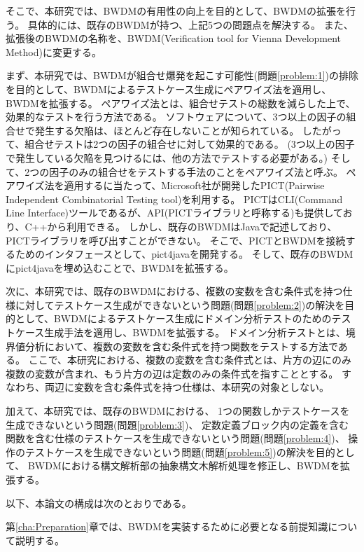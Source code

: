 \documentclass[uplatex, report, a4j, 10pt]{jsbook}
\newcommand{\tool}{BWDM}
\newcommand{\toolFullName}{Verification tool for Vienna Development Method}
\begin{document}
そこで、本研究では、BWDMの有用性の向上を目的として、BWDMの拡張を行う\cite{hirakoba1, hirakoba2, hirakoba3, hirakoba4, hirakoba5}。
具体的には、既存のBWDMが持つ、上記5つの問題点を解決する。
また、拡張後のBWDMの名称を、\tool{}(\toolFullName{})に変更する。

まず、本研究では、BWDMが組合せ爆発を起こす可能性(問題\ref{problem:1})の排除を目的として、BWDMによるテストケース生成にペアワイズ法を適用し、BWDMを拡張する。
ペアワイズ法とは、組合せテストの総数を減らした上で、効果的なテストを行う方法である\cite{pairwise}。
ソフトウェアについて、3つ以上の因子の組合せで発生する欠陥は、ほとんど存在しないことが知られている\cite{over3fact}。
したがって、組合せテストは2つの因子の組合せに対して効果的である。
(3つ以上の因子で発生している欠陥を見つけるには、他の方法でテストする必要がある。)
そして、2つの因子のみの組合せをテストする手法のことをペアワイズ法と呼ぶ。
ペアワイズ法を適用するに当たって、Microsoft社が開発したPICT(Pairwise Independent Combinatorial Testing tool)\cite{pict}を利用する。
PICTはCLI(Command Line Interface)ツールであるが、API(PICTライブラリと呼称する)も提供しており、C++から利用できる。
しかし、既存のBWDMはJavaで記述しており、PICTライブラリを呼び出すことができない。
そこで、PICTとBWDMを接続するためのインタフェースとして、pict4javaを開発する。
そして、既存のBWDMにpict4javaを埋め込むことで、BWDMを拡張する。

次に、本研究では、既存のBWDMにおける、複数の変数を含む条件式を持つ仕様に対してテストケース生成ができないという問題(問題\ref{problem:2})の解決を目的として、BWDMによるテストケース生成にドメイン分析テストのためのテストケース生成手法を適用し、BWDMを拡張する。
ドメイン分析テストとは、境界値分析において、複数の変数を含む条件式を持つ関数をテストする方法である\cite{izon}\cite{istqb}。
ここで、本研究における、複数の変数を含む条件式とは、片方の辺にのみ複数の変数が含まれ、もう片方の辺は定数のみの条件式を指すこととする。
すなわち、両辺に変数を含む条件式を持つ仕様は、本研究の対象としない。

加えて、本研究では、既存のBWDMにおける、
1つの関数しかテストケースを生成できないという問題(問題\ref{problem:3})、
定数定義ブロック内の定義を含む関数を含む仕様のテストケースを生成できないという問題(問題\ref{problem:4})、
操作のテストケースを生成できないという問題(問題\ref{problem:5})の解決を目的として、
BWDMにおける構文解析部の抽象構文木解析処理を修正し、BWDMを拡張する。

以下、本論文の構成は次のとおりである。

第\ref{cha:Preparation}章では、\tool{}を実装するために必要となる前提知識について説明する。
\end{document}
